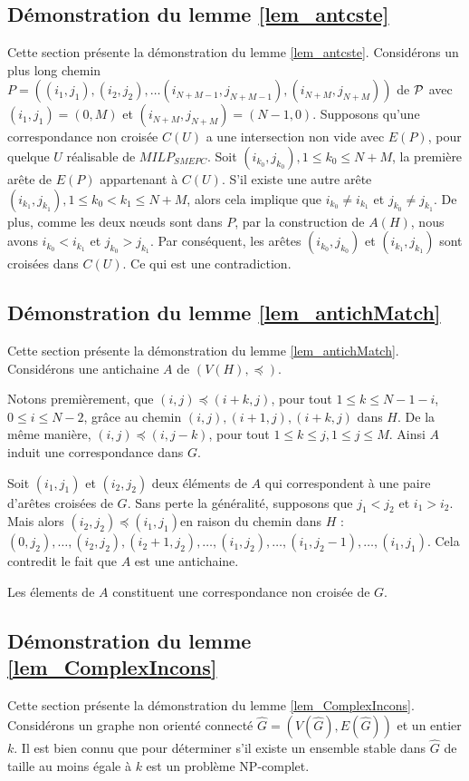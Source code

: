 {{\subsection{Démonstration du lemme \ref{lem_antcste}}
\label{lem_antcste_section}
Cette section présente la démonstration du lemme \ref{lem_antcste}.
Considérons un plus long chemin $P =( (i_1, j_1), (i_2, j_2), \dots (i_{N+M-1}, j_{N+M-1}), (i_{N+M}, j_{N+M}))$ de ${\cal P}$
avec $(i_1, j_1)=(0,M)$ et $(i_{N+M}, j_{N+M})=(N-1, 0)$. Supposons qu'une correspondance non croisée $C(U)$ a une intersection non vide avec $E(P)$, pour quelque $U$ réalisable de $MILP_{SMEPC}$. Soit $(i_{k_0},j_{k_0}), 1 \leq k_0 \leq N+M$, la première arête de $E(P)$ appartenant à  $C(U)$.
S'il existe une autre arête $(i_{k_1},j_{k_1}), 1 \leq k_0 < k_1 \leq N+M$, alors cela implique que $ i_{k_0} \neq i_{k_1}$ et $ j_{k_0} \neq j_{k_1}$. De plus, comme les deux nœuds sont dans $P$, par la construction de $A(H)$, nous avons $ i_{k_0} < i_{k_1}$ et $ j_{k_0} > j_{k_1}$. Par conséquent, les arêtes $(i_{k_0},j_{k_0})$ et $(i_{k_1},j_{k_1})$ sont croisées dans $C(U)$. Ce qui est une contradiction.

\subsection{Démonstration du lemme \ref{lem_antichMatch}}
\label{lem_antichMatch_section}
Cette section présente la démonstration du lemme \ref{lem_antichMatch}.
Considérons une antichaine $A$ de $(V(H),\preceq)$.

Notons premièrement, que $(i,j) \preceq (i+k,j)$, pour tout $1 \leq k \leq N-1-i$, $0 \leq i\leq N-2$, grâce au chemin $(i,j), (i+1,j), (i+k,j)$ dans $H$. De la même manière, $(i,j) \preceq (i,j-k)$, pour tout $1 \leq k \leq j, 1\leq j \leq M$. Ainsi $A$ induit une correspondance dans $G$.

Soit $(i_1,j_1)$ et $(i_2,j_2)$ deux éléments de $A$ qui correspondent à une paire d'arêtes croisées de $G$. Sans perte la généralité, supposons que $j_1<j_2$ et $i_1 >i_2$. Mais alors $(i_2,j_2)\preceq (i_1,j_1)$en raison du chemin dans $H$ : $(0,j_2),\dots,(i_2,j_2), (i_2+1,j_2), \dots, (i_1,j_2), \dots, (i_1,j_2-1), \dots,(i_1,j_1) $. Cela contredit le fait que $A$ est une antichaine. 

Les élements de $A$ constituent une correspondance non croisée de $G$.



\subsection{Démonstration du lemme \ref{lem_ComplexIncons}}
\label{lem_ComplexIncons_section}
Cette section présente la démonstration du lemme \ref{lem_ComplexIncons}.
Considérons un graphe non orienté connecté $\hat{G} = (V(\hat{G}), E(\hat{G}))$ et un entier $k$. Il est bien connu que pour déterminer s'il existe un ensemble stable dans $\hat{G}$ de taille au moins égale à $k$ est un problème NP-complet.

}}
